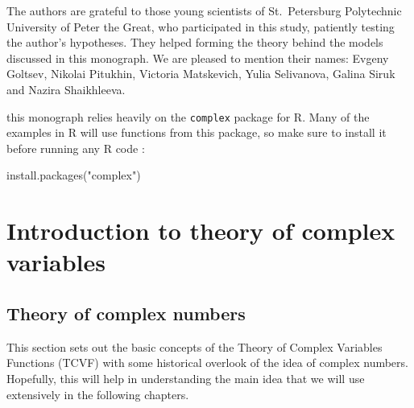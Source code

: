 \documentclass[
]{book}
\newenvironment{Shaded}{\begin{snugshade}}{\end{snugshade}}
\newcommand{\FunctionTok}[1]{\textcolor[rgb]{0.00,0.00,0.00}{#1}}
\newcommand{\NormalTok}[1]{#1}
\newcommand{\StringTok}[1]{\textcolor[rgb]{0.31,0.60,0.02}{#1}}
\begin{document}
The authors are grateful to those young scientists of St.~Petersburg Polytechnic University of Peter the Great, who participated in this study, patiently testing the author's hypotheses. They helped forming the theory behind the models discussed in this monograph. We are pleased to mention their names: Evgeny Goltsev, Nikolai Pitukhin, Victoria Matskevich, Yulia Selivanova, Galina Siruk and Nazira Shaikhleeva.

this monograph relies heavily on the \texttt{complex} package for R. Many of the examples in R will use functions from this package, so make sure to install it before running any R code \citep{R-complex}:

\begin{Shaded}
\begin{Highlighting}[]
\FunctionTok{install.packages}\NormalTok{(}\StringTok{"complex"}\NormalTok{)}
\end{Highlighting}
\end{Shaded}

\hypertarget{intro}{%
\chapter{Introduction to theory of complex variables}\label{intro}}

\hypertarget{theoryOfComplexNumbers}{%
\section{Theory of complex numbers}\label{theoryOfComplexNumbers}}

This section sets out the basic concepts of the Theory of Complex Variables Functions (TCVF) with some historical overlook of the idea of complex numbers. Hopefully, this will help in understanding the main idea that we will use extensively in the following chapters.
\end{document}
